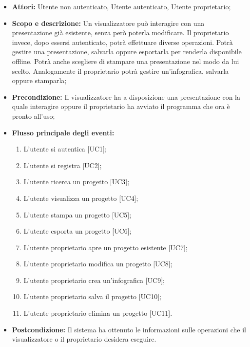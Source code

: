 \begin{itemize}
	\item \textbf{Attori:} Utente non autenticato, Utente autenticato, Utente proprietario;
	
	\item \textbf{Scopo e descrizione:} Un visualizzatore può interagire con una presentazione già esistente, senza però poterla modificare. Il proprietario invece, dopo essersi autenticato, potrà effettuare diverse operazioni. Potrà gestire una presentazione, salvarla oppure esportarla per renderla disponibile offline. Potrà anche scegliere di stampare una presentazione nel modo da lui scelto. Analogamente il proprietario potrà gestire un'infografica, salvarla oppure stamparla;
	
	\item \textbf{Precondizione:} Il visualizzatore ha a disposizione una presentazione con la quale interagire oppure il proprietario ha avviato il programma che ora è pronto all'uso;
	
	\item \textbf{Flusso principale degli eventi:}
	\begin{enumerate}
		\item L'utente si autentica [UC1];
		\item L'utente si registra [UC2];
		
		\item L'utente ricerca un progetto [UC3];
		\item L'utente visualizza un progetto [UC4];
		\item L'utente stampa un progetto [UC5];
		\item L'utente esporta un progetto [UC6];

		\item L'utente proprietario apre un progetto esistente [UC7];

		\item L'utente proprietario modifica un progetto [UC8];
		\item L'utente proprietario crea un'infografica [UC9];		
	
		\item L'utente proprietario salva il progetto [UC10];
		\item L'utente proprietario elimina un progetto [UC11].
	\end{enumerate}
	
	\item \textbf{Postcondizione:} Il sistema ha ottenuto le informazioni sulle operazioni che il visualizzatore o il proprietario desidera eseguire.
\end{itemize}

